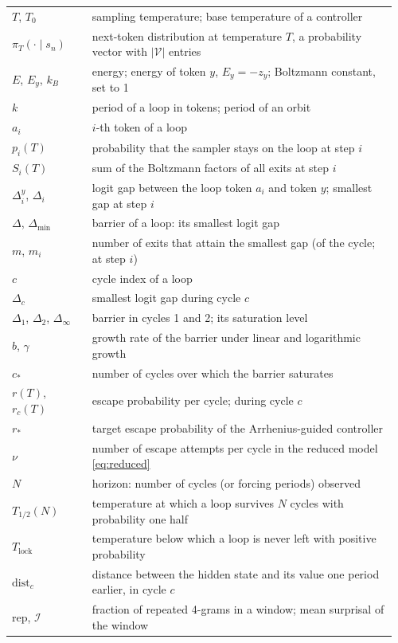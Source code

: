 {\begin{longtable}{@{}p{0.2\linewidth}p{0.76\linewidth}@{}}
$T$, $T_0$ & sampling temperature; base temperature of a controller \\
$\pi_T(\cdot\mid s_n)$ & next-token distribution at temperature $T$, a probability vector with $|\mathcal V|$ entries \\
$E$, $E_y$, $k_B$ & energy; energy of token $y$, $E_y=-z_y$; Boltzmann constant, set to 1 \\
$k$ & period of a loop in tokens; period of an orbit \\
$a_i$ & $i$-th token of a loop \\
$p_i(T)$ & probability that the sampler stays on the loop at step $i$ \\
$S_i(T)$ & sum of the Boltzmann factors of all exits at step $i$ \\
$\Delta_i^{y}$, $\Delta_i$ & logit gap between the loop token $a_i$ and token $y$; smallest gap at step $i$ \\
$\Delta$, $\Delta_{\min}$ & barrier of a loop: its smallest logit gap \\
$m$, $m_i$ & number of exits that attain the smallest gap (of the cycle; at step $i$) \\
$c$ & cycle index of a loop \\
$\Delta_c$ & smallest logit gap during cycle $c$ \\
$\Delta_1$, $\Delta_2$, $\Delta_\infty$ & barrier in cycles 1 and 2; its saturation level \\
$b$, $\gamma$ & growth rate of the barrier under linear and logarithmic growth \\
$c_\ast$ & number of cycles over which the barrier saturates \\
$r(T)$, $r_c(T)$ & escape probability per cycle; during cycle $c$ \\
$r_\ast$ & target escape probability of the Arrhenius-guided controller \\
$\nu$ & number of escape attempts per cycle in the reduced model \eqref{eq:reduced} \\
$N$ & horizon: number of cycles (or forcing periods) observed \\
$T_{1/2}(N)$ & temperature at which a loop survives $N$ cycles with probability one half \\
$T_{\mathrm{lock}}$ & temperature below which a loop is never left with positive probability \\
$\mathrm{dist}_c$ & distance between the hidden state and its value one period earlier, in cycle $c$ \\
$\mathrm{rep}$, $\mathcal I$ & fraction of repeated 4-grams in a window; mean surprisal of the window \\

\end{longtable}}
